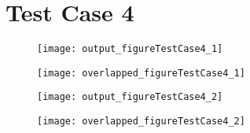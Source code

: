 \section{Test Case 4}

\begin{figure}
  \centering
  \texttt{[image: output\_figureTestCase4\_1]}
  \caption{}\label{figure_testcase4_1}
\end{figure}

\begin{figure}
  \centering
  \texttt{[image: overlapped\_figureTestCase4\_1]}
  \caption{}\label{figure_testcase4_1_overlapped}
\end{figure}

\begin{figure}
  \centering
  \texttt{[image: output\_figureTestCase4\_2]}
  \caption{}\label{figure_testcase4_2}
\end{figure}

\begin{figure}
  \centering
  \texttt{[image: overlapped\_figureTestCase4\_2]}
  \caption{}\label{figure_testcase4_2_overlapped}
\end{figure}
